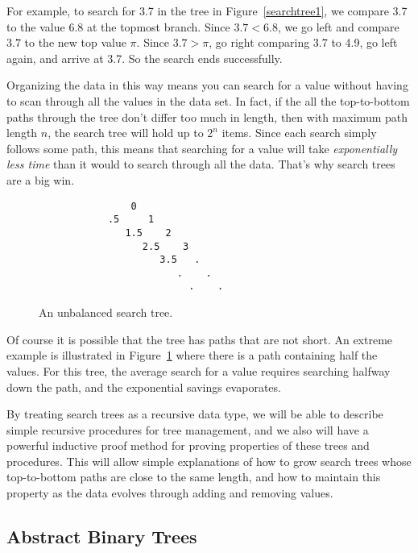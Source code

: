 For example, to search for 3.7 in the tree in Figure~\ref{searchtree1},
we compare 3.7 to the value 6.8 at the topmost branch.  Since $3.7 <
6.8$, we go left and compare $3.7$ to the new top value $\pi$.  Since
$3.7 > \pi$, go right comparing 3.7 to 4.9, go left again, and arrive
at 3.7. So the search ends successfully.

Organizing the data in this way means you can search for a value
without having to scan through all the values in the data set.  In
fact, if the all the top-to-bottom paths through the tree don't differ
too much in length, then with maximum path length $n$, the search tree
will hold up to $2^n$ items.  Since each search simply follows some
path, this means that searching for a value will take
\emph{exponentially less time} than it would to search through all the
data.  That's why search trees are a big win.

\begin{figure}


\begin{verbatim}
                0
            .5     1
               1.5    2
                  2.5    3
                     3.5   .
                        .    .
                          .    .
\end{verbatim}   

\caption{An unbalanced search tree.}

\label{unbalanced}

\end{figure}

Of course it is possible that the tree has paths that are not short.
An extreme example is illustrated in Figure~\ref{unbalanced} where
there is a path containing half the values.  For this tree, the
average search for a value requires searching halfway down the path,
and the exponential savings evaporates.

By treating search trees as a recursive data type, we will be able to
describe simple recursive procedures for tree management, and we also
will have a powerful inductive proof method for proving properties of
these trees and procedures.  This will allow simple explanations of
how to grow search trees whose top-to-bottom paths are close to the
same length, and how to maintain this property as the data evolves
through adding and removing values.

\subsection{Abstract Binary Trees}

